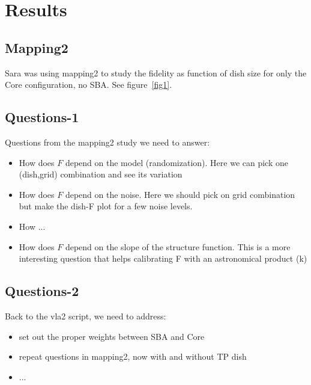 \documentclass[11pt,twoside]{article}
\begin{document}
\section{Results}

\subsection{Mapping2}

Sara was using mapping2 to study the fidelity as function of dish size for
only the Core configuration, no SBA. See figure~\ref{fig1}.



\subsection{Questions-1}


Questions from the mapping2 study we need to answer:

\begin{itemize}

  \item How does $F$ depend on the model (randomization). Here we can pick one
    (dish,grid) combination and see its variation
  \item How does $F$ depend on the noise. Here we should pick on grid combination
    but make the dish-F plot for a few noise levels.
  \item How ...
  \item How does $F$ depend on the slope of the structure function. This is
    a more interesting question that helps calibrating F with an astronomical
    product (k)
  
\end{itemize}

\subsection{Questions-2}

Back to the vla2 script, we need to address:

\begin{itemize}

  \item set out the proper weights between SBA and Core
  \item repeat questions in mapping2, now with and without TP dish
  \item ...
\end{itemize}
\end{document}
